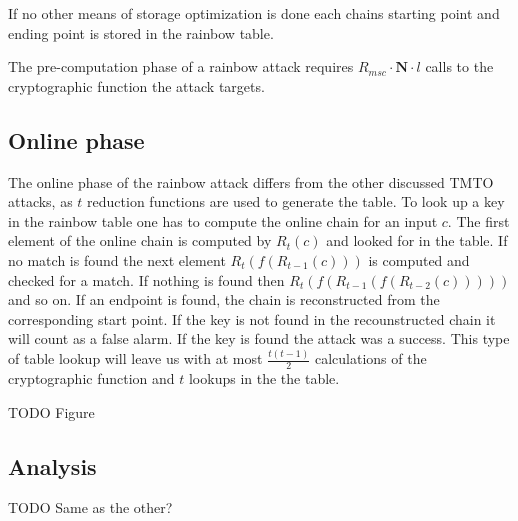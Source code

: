 If no other means of storage optimization is done each chains
starting point and ending point is stored in the rainbow table.

The pre-computation phase of a rainbow attack requires
$R_{msc} \cdot \textbf{N} \cdot l$ calls to the cryptographic function the attack targets.

\subsection{Online phase}
\label{sec:onlinerb}

The online phase of the rainbow attack differs from the other
discussed TMTO attacks, as $t$ reduction functions are used to
generate the table. To look up a key in the rainbow table one has to
compute the online chain for an input $c$. The first element of
the online chain is computed by $R_t(c)$ and looked for in the
table. If no match is found the next element $R_t(f(R_{t-1}(c)))$ is
computed and checked for a match. If nothing is found then $R_t(f(R_{t-1}(f(R_{t-2}(c)))))$
and so on. If an endpoint is found, the chain is reconstructed from the corresponding start
point. If the key is not found in the recounstructed chain it will count
as a false alarm. If the key is found the attack was a
success. This type of table lookup will leave us with at most
$\frac{t(t - 1)}{2}$ calculations of the cryptographic function and
$t$ lookups in the the table.

TODO Figure

\subsection{Analysis}

TODO Same as the other?



